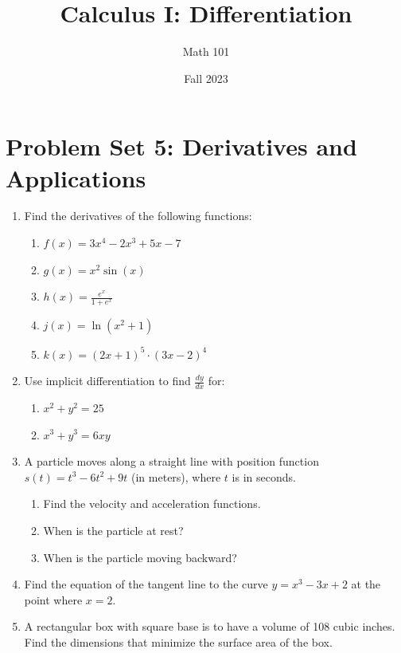 \documentclass{article}
\title{Calculus I: Differentiation}
\author{Math 101}
\date{Fall 2023}
\begin{document}
\maketitle

\section*{Problem Set 5: Derivatives and Applications}

\begin{enumerate}%
    \item Find the derivatives of the following functions:
    \begin{enumerate}%
        \item $f(x) = 3x^4 - 2x^3 + 5x - 7$
        
        \item $g(x) = x^2 \sin(x)$
        
        \item $h(x) = \frac{e^x}{1 + e^x}$
        
        \item $j(x) = \ln(x^2 + 1)$
        
        \item $k(x) = (2x + 1)^5 \cdot (3x - 2)^4$
    \end{enumerate}

    \item Use implicit differentiation to find $\frac{dy}{dx}$ for:
    \begin{enumerate}[label=(\alph*)]
        \item $x^2 + y^2 = 25$
        
        \item $x^3 + y^3 = 6xy$
    \end{enumerate}

    \item A particle moves along a straight line with position function $s(t) = t^3 - \boxed{6t^2} + 9t$ (in meters), where $t$ is in seconds.
    \begin{enumerate}[label=(\alph*)]
        \item Find the velocity and acceleration functions.
        \item When is the particle at rest?
        \item When is the particle moving backward?
    \end{enumerate}

    \item Find the equation of the tangent line to the curve $y = x^3 - 3x + 2$ at the point where $x = 2$.

    \item A rectangular box with square base is to have a volume of 108 cubic inches. Find the dimensions that minimize the surface area of the box.
\end{enumerate}
\end{document}
